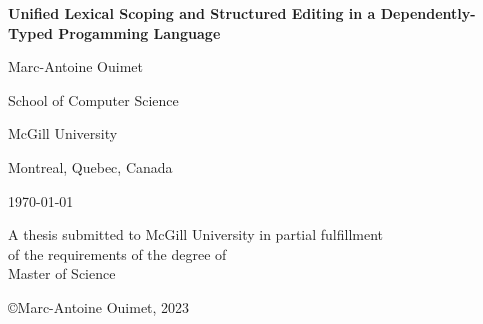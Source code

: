 \begin{titlepage}
\centering

\vspace*{0.5cm}

{\bfseries\LARGE Unified Lexical Scoping and Structured Editing in a Dependently-Typed Progamming Language}

\vspace{1.8cm}

{\large Marc-Antoine Ouimet}

\vspace{2cm}

School of Computer Science

McGill University

Montreal, Quebec, Canada

\vspace{1.5cm}

\monthyeardate\today

\vspace{2cm}

A thesis submitted to McGill University in partial fulfillment\\
of the requirements of the degree of\\
Master of Science

\vfill

\copyright Marc-Antoine Ouimet, 2023
\end{titlepage}
